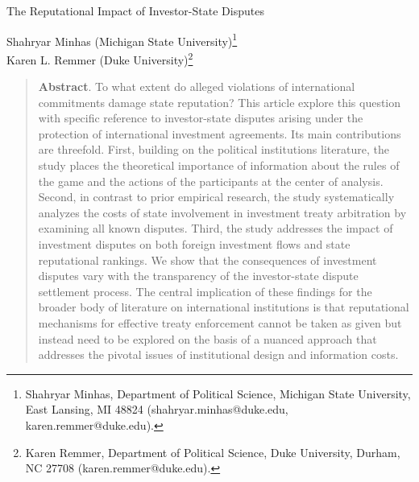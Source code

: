 \documentclass[12pt,onesided]{amsart}
\begin{document}
\thispagestyle{empty}

\begin{center}
{\sc \large The Reputational Impact of Investor-State Disputes}
\end{center}

\vspace{10mm}

\begin{center}
{\sc Shahryar Minhas (Michigan State University)}\footnote{Shahryar Minhas, Department of Political Science, Michigan State University, East Lansing, MI 48824 (shahryar.minhas@duke.edu, karen.remmer@duke.edu).} \\
{\sc Karen L. Remmer (Duke University)}\footnote{Karen Remmer, Department of Political Science, Duke University, Durham, NC 27708 (karen.remmer@duke.edu).}
\end{center}

\vspace{20mm}


\begin{quote}
	\noindent \textbf{Abstract}. To what extent do alleged violations of international commitments damage state  reputation? This article explore this question with specific reference to investor-state disputes arising under the protection  of international investment agreements. Its main contributions are threefold. First, building on the political institutions literature, the study places the theoretical importance of information about the rules of the game and the actions of the participants at the center of analysis. Second, in contrast to prior empirical research, the study systematically analyzes  the costs of state involvement in investment treaty arbitration by examining all known disputes.  Third, the study addresses  the impact of investment disputes on both foreign investment flows and state reputational rankings. We show that the consequences of investment disputes vary with the transparency of the investor-state dispute settlement process. The  central  implication  of these  findings for the  broader  body of literature on international institutions is that  reputational mechanisms  for effective treaty  enforcement  cannot  be taken  as given but  instead  need  to be explored on the basis of a nuanced  approach that  addresses  the pivotal issues of institutional design and information costs.
\end{quote}
 
\end{document}

